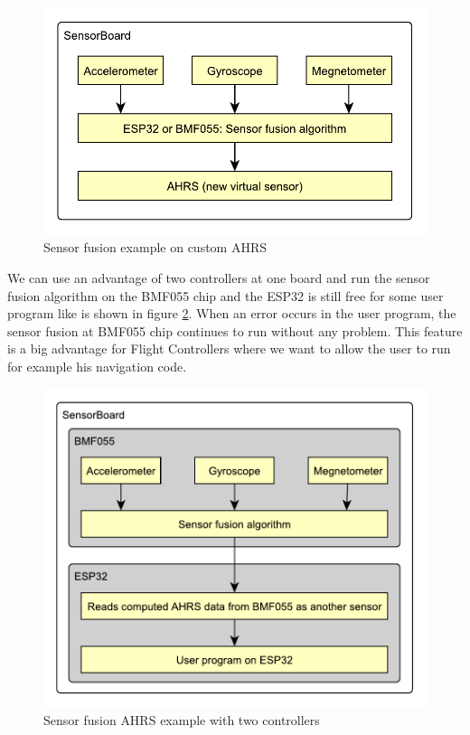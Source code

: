 \begin{figure}
    \centering
    \label{UEAHRS}
    \caption{Sensor fusion example on custom \ac{AHRS}}
    \includegraphics[scale=1]{img/UsageExamplesAHRS.pdf}
\end{figure}

We can use an advantage of two controllers at one board and run the sensor fusion algorithm on the BMF055 chip and the ESP32 is still free for some user program like is shown in figure \ref{UEAHRSBMF}. When an error occurs in the user program, the sensor fusion at BMF055 chip continues to run without any problem. This feature is a big advantage for Flight Controllers where we want to allow the user to run for example his navigation code.

\begin{figure}
    \centering
    \label{UEAHRSBMF}
    \caption{Sensor fusion \ac{AHRS} example with two controllers}
    \includegraphics[scale=1]{img/UsageExamplesAHRSBMF.pdf}
\end{figure}

